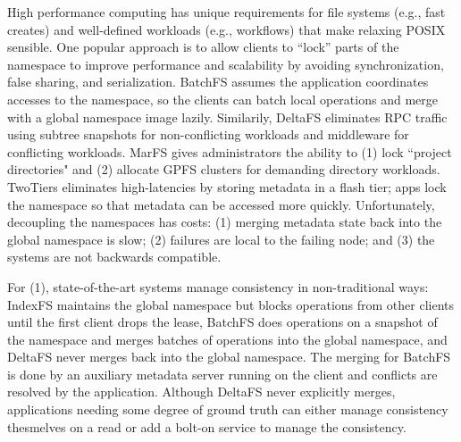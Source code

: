 \documentclass[preprint]{sigplanconf-eurosys}
\begin{document}
High performance computing has unique requirements for file systems ({e.g.},
fast creates) and well-defined workloads (e.g., workflows) that make relaxing
POSIX sensible.  One popular approach is to allow clients to ``lock'' parts of
the namespace to improve performance and scalability by avoiding
synchronization, false sharing, and serialization.  BatchFS assumes the
application coordinates accesses to the namespace, so the clients can batch
local operations and merge with a global namespace image lazily. Similarily,
DeltaFS eliminates RPC traffic using subtree snapshots for non-conflicting
workloads and middleware for conflicting workloads. MarFS gives administrators
the ability to (1) lock ``project directories" and (2) allocate GPFS clusters
for demanding directory workloads. TwoTiers eliminates high-latencies by
storing metadata in a flash tier; apps lock the namespace so that metadata can
be accessed more quickly.  Unfortunately, decoupling the namespaces has costs:
(1) merging metadata state back into the global namespace is slow; (2) failures
are local to the failing node; and (3) the systems are not backwards
compatible. 


For (1), state-of-the-art systems manage consistency in non-traditional ways:
IndexFS maintains the global namespace but blocks operations from other clients
until the first client drops the lease, BatchFS does operations on a snapshot
of the namespace and merges batches of operations into the global namespace,
and DeltaFS never merges back into the global namespace. The merging for
BatchFS is done by an auxiliary metadata server running on the client and
conflicts are resolved by the application. Although DeltaFS never explicitly
merges, applications needing some degree of ground truth can either manage
consistency thesmelves on a read or add a bolt-on service to manage the
consistency.
\end{document}
